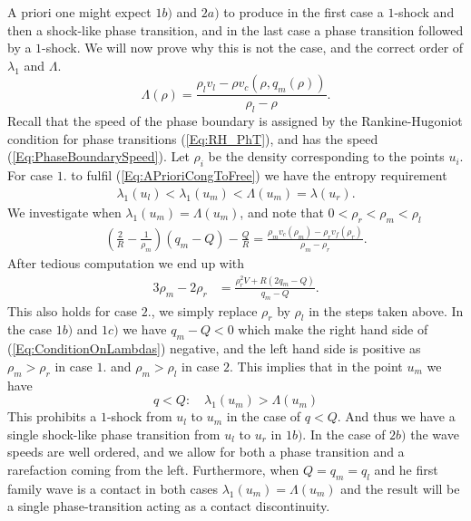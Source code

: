 \documentclass[10pt]{article}
\numberwithin{equation}{section}
\begin{document}
\begin{enumerate}
A priori one might expect $1b)$ and $2a)$ to produce in the first case a $1$-shock and then a shock-like phase transition, and in the last case a phase transition followed by a $1$-shock. We will now prove why this is not the case, and the correct order of $\lambda_1$ and $\Lambda$. 
\begin{equation}
    \Lambda(\rho) = \frac{\rho_l v_l - \rho v_c(\rho, q_m(\rho))}{\rho_l - \rho}.
    \label{Eq:PhaseBoundarySpeed}
\end{equation}
Recall that the speed of the phase boundary is assigned by the Rankine-Hugoniot condition for phase transitions (\ref{Eq:RH_PhT}), and has the speed (\ref{Eq:PhaseBoundarySpeed}). Let $\rho_i$ be the density corresponding to the points $u_i$. For case $1.$ to fulfil (\ref{Eq:APrioriCongToFree}) we have the entropy requirement 
\begin{align*}
    \lambda_1(u_l) < \lambda_1(u_m) < \Lambda(u_m) = \lambda(u_r).
\end{align*}
We investigate when $\lambda_1(u_m) = \Lambda(u_m)$, and note that $0 < \rho_r < \rho_m < \rho_l$
\begin{align*}
    (\frac{2}{R} - \frac{1}{\rho_m})(q_m -Q) - \frac{Q}{R} = \frac{\rho_m v_c(\rho_m) - \rho_r v_f(\rho_r)}{\rho_m - \rho_r}.
\end{align*}
After tedious computation we end up with
\begin{align}
    3\rho_m - 2\rho_r &= \frac{\rho_r^2 V + R(2q_m -Q)}{q_m -Q}.
    \label{Eq:ConditionOnLambdas}
\end{align}
This also holds for case $2.$, we simply replace $\rho_r$ by $\rho_l$ in the steps taken above.
In the case $1b)$ and $1c)$ we have $q_m - Q < 0 $ which make the right hand side of (\ref{Eq:ConditionOnLambdas}) negative, and the left hand side is positive as $\rho_m > \rho_r$ in case $1.$ and $\rho_m > \rho_l$ in case $2$. This implies that in the point $u_m$ we have 
\begin{equation*}
  q < Q: \quad \lambda_1(u_m) > \Lambda(u_m)
\end{equation*}
This prohibits a $1$-shock from $u_l$ to $u_m $ in the case of $q < Q$. And thus we have a single shock-like phase transition from $u_l$ to $u_r$ in $1b)$. In the case of $2b)$ the wave speeds are well ordered, and we allow for both a phase transition and a rarefaction coming from the left. Furthermore, when $Q = q_m = q_l$ and he first family wave is a contact in both cases $\lambda_1(u_m) = \Lambda(u_m)$ and the result will be a single phase-transition acting as a contact discontinuity. 

\end{enumerate}
\end{document}
